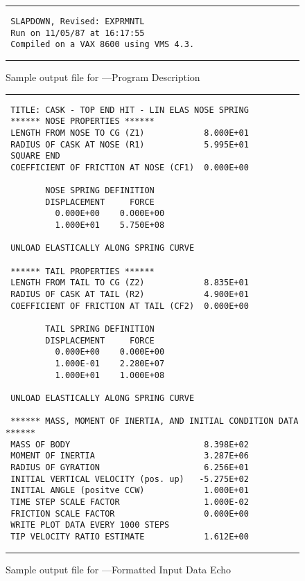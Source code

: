 \begin{figure}
\parskip0pt
\hrule
\small
\begin{verbatim}
 SLAPDOWN, Revised: EXPRMNTL
 Run on 11/05/87 at 16:17:55
 Compiled on a VAX 8600 using VMS 4.3.
\end{verbatim}
\hrule
\caption{Sample output file for \SLAP---Program Description}\label{sampout1}
\end{figure}
\begin{figure}
\parskip0pt
\hrule\small
\begin{verbatim}
 TITLE: CASK - TOP END HIT - LIN ELAS NOSE SPRING
 ****** NOSE PROPERTIES ******
 LENGTH FROM NOSE TO CG (Z1)            8.000E+01
 RADIUS OF CASK AT NOSE (R1)            5.995E+01
 SQUARE END
 COEFFICIENT OF FRICTION AT NOSE (CF1)  0.000E+00

        NOSE SPRING DEFINITION
        DISPLACEMENT     FORCE
          0.000E+00    0.000E+00
          1.000E+01    5.750E+08

 UNLOAD ELASTICALLY ALONG SPRING CURVE

 ****** TAIL PROPERTIES ******
 LENGTH FROM TAIL TO CG (Z2)            8.835E+01
 RADIUS OF CASK AT TAIL (R2)            4.900E+01
 COEFFICIENT OF FRICTION AT TAIL (CF2)  0.000E+00

        TAIL SPRING DEFINITION
        DISPLACEMENT     FORCE
          0.000E+00    0.000E+00
          1.000E-01    2.280E+07
          1.000E+01    1.000E+08

 UNLOAD ELASTICALLY ALONG SPRING CURVE

 ****** MASS, MOMENT OF INERTIA, AND INITIAL CONDITION DATA ******
 MASS OF BODY                           8.398E+02
 MOMENT OF INERTIA                      3.287E+06
 RADIUS OF GYRATION                     6.256E+01
 INITIAL VERTICAL VELOCITY (pos. up)   -5.275E+02
 INITIAL ANGLE (positve CCW)            1.000E+01
 TIME STEP SCALE FACTOR                 1.000E-02
 FRICTION SCALE FACTOR                  0.000E+00
 WRITE PLOT DATA EVERY 1000 STEPS
 TIP VELOCITY RATIO ESTIMATE            1.612E+00
\end{verbatim}
\hrule
\caption{Sample output file for \SLAP---Formatted Input
Data Echo}\label{sampout2} 
\end{figure}

